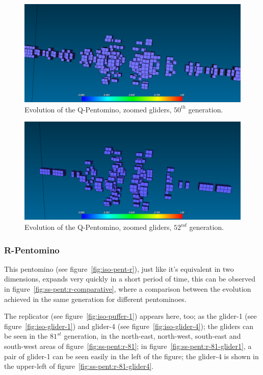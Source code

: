 \begin{figure}
	\centering
	\includegraphics[scale=0.3]{pentominoes_ss/q_50_gliders.png}
	\caption{Evolution of the Q-Pentomino, zoomed gliders, $50^{th}$ generation.}
  \label{fig:ss-pent:q-50-gliders}
\end{figure}

\begin{figure}
	\centering
	\includegraphics[scale=0.3]{pentominoes_ss/q_52_gliders.png}
	\caption{Evolution of the Q-Pentomino, zoomed gliders, $52^{nd}$ generation.}
  \label{fig:ss-pent:q-52-gliders}
\end{figure}

\subsubsection{R-Pentomino}
\label{sec:r-pentomino}
This pentomino (see figure~\ref{fig:iso-pent-r}), just like it's equivalent in
two dimensions, expands very quickly in a short period of time, this can be
observed in figure~\ref{fig:ss-pent:r-comparative}, where a comparison between
the evolution achieved in the same generation for different pentominoes.

The replicator (see figure~\ref{fig:iso-puffer-1}) appears here, too; as the
glider-1 (see figure~\ref{fig:iso-glider-1}) and glider-4 (see
figure~\ref{fig:iso-glider-4}); the gliders can be seen in the  $81^{st}$
generation, in the north-east, north-west, south-east and south-west areas of
figure~\ref{fig:ss-pent:r-81}; in figure~\ref{fig:ss-pent:r-81-glider1}, a
pair of glider-1 can be seen easily in the left of the figure; the glider-4 is
shown in the upper-left of figure~\ref{fig:ss-pent:r-81-glider4}.

